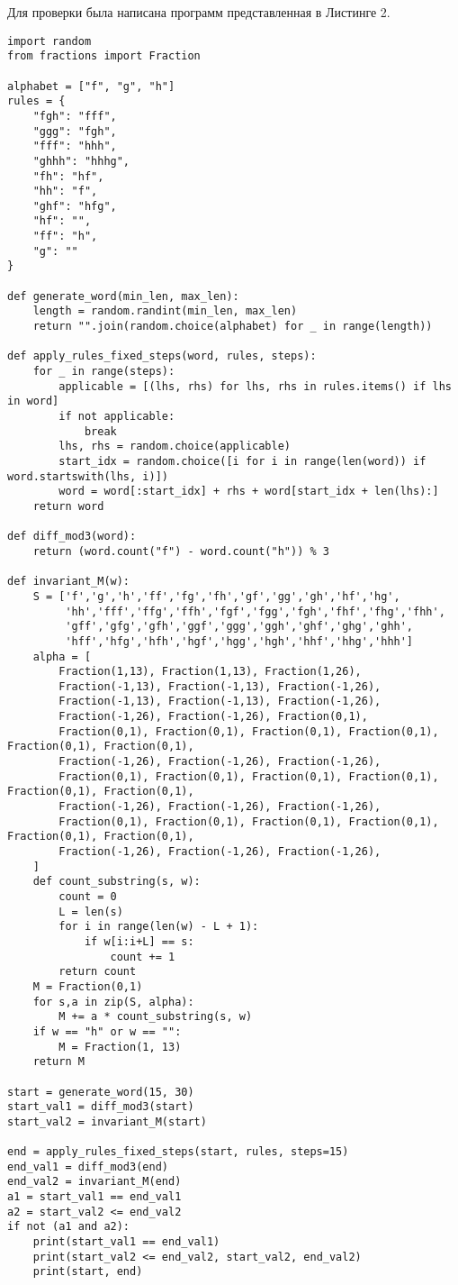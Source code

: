 \documentclass[a4paper, 14pt]{extarticle}
\begin{document}
Для проверки была написана программ представленная в Листинге 2.
\begin{lstlisting}
import random
from fractions import Fraction

alphabet = ["f", "g", "h"]
rules = {
    "fgh": "fff",
    "ggg": "fgh",
    "fff": "hhh",
    "ghhh": "hhhg",
    "fh": "hf",
    "hh": "f",
    "ghf": "hfg",
    "hf": "",
    "ff": "h",
    "g": ""
}

def generate_word(min_len, max_len):
    length = random.randint(min_len, max_len)
    return "".join(random.choice(alphabet) for _ in range(length))

def apply_rules_fixed_steps(word, rules, steps):
    for _ in range(steps):
        applicable = [(lhs, rhs) for lhs, rhs in rules.items() if lhs in word]
        if not applicable:
            break 
        lhs, rhs = random.choice(applicable)
        start_idx = random.choice([i for i in range(len(word)) if word.startswith(lhs, i)])
        word = word[:start_idx] + rhs + word[start_idx + len(lhs):]
    return word

def diff_mod3(word):
    return (word.count("f") - word.count("h")) % 3

def invariant_M(w):
    S = ['f','g','h','ff','fg','fh','gf','gg','gh','hf','hg',
         'hh','fff','ffg','ffh','fgf','fgg','fgh','fhf','fhg','fhh',
         'gff','gfg','gfh','ggf','ggg','ggh','ghf','ghg','ghh',
         'hff','hfg','hfh','hgf','hgg','hgh','hhf','hhg','hhh']
    alpha = [
        Fraction(1,13), Fraction(1,13), Fraction(1,26),
        Fraction(-1,13), Fraction(-1,13), Fraction(-1,26),
        Fraction(-1,13), Fraction(-1,13), Fraction(-1,26),
        Fraction(-1,26), Fraction(-1,26), Fraction(0,1),
        Fraction(0,1), Fraction(0,1), Fraction(0,1), Fraction(0,1), Fraction(0,1), Fraction(0,1),
        Fraction(-1,26), Fraction(-1,26), Fraction(-1,26),
        Fraction(0,1), Fraction(0,1), Fraction(0,1), Fraction(0,1), Fraction(0,1), Fraction(0,1),
        Fraction(-1,26), Fraction(-1,26), Fraction(-1,26),
        Fraction(0,1), Fraction(0,1), Fraction(0,1), Fraction(0,1), Fraction(0,1), Fraction(0,1),
        Fraction(-1,26), Fraction(-1,26), Fraction(-1,26),
    ]
    def count_substring(s, w):
        count = 0
        L = len(s)
        for i in range(len(w) - L + 1):
            if w[i:i+L] == s:
                count += 1
        return count
    M = Fraction(0,1)
    for s,a in zip(S, alpha):
        M += a * count_substring(s, w)
    if w == "h" or w == "":
        M = Fraction(1, 13)
    return M

start = generate_word(15, 30)
start_val1 = diff_mod3(start)
start_val2 = invariant_M(start)
    
end = apply_rules_fixed_steps(start, rules, steps=15)
end_val1 = diff_mod3(end)
end_val2 = invariant_M(end)
a1 = start_val1 == end_val1
a2 = start_val2 <= end_val2
if not (a1 and a2):
    print(start_val1 == end_val1)
    print(start_val2 <= end_val2, start_val2, end_val2)
    print(start, end)
\end{lstlisting}
\end{document}
